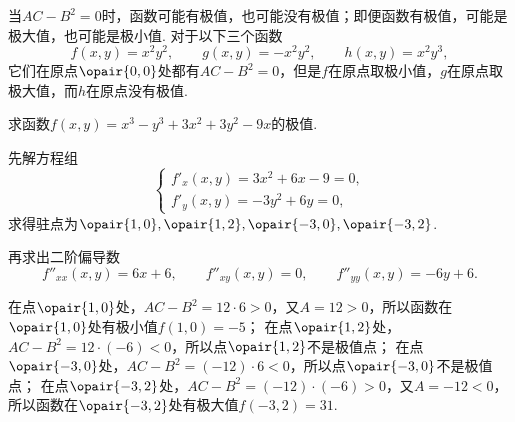 \begin{example}
当\(AC-B^2=0\)时，函数可能有极值，也可能没有极值；即便函数有极值，可能是极大值，也可能是极小值.
对于以下三个函数\[
f(x,y) = x^2 y^2,
\qquad
g(x,y) = -x^2 y^2,
\qquad
h(x,y) = x^2 y^3,
\]它们在原点\(\opair{0,0}\)处都有\(AC-B^2=0\)，但是\(f\)在原点取极小值，\(g\)在原点取极大值，而\(h\)在原点没有极值.
\end{example}

\begin{example}
求函数\(f(x,y) = x^3-y^3+3x^2+3y^2-9x\)的极值.
\begin{solution}
先解方程组\[
\left\{ \begin{array}{l}
f'_x(x,y) = 3x^2+6x-9 = 0, \\
f'_y(x,y) = -3y^2+6y = 0,
\end{array} \right.
\]求得驻点为\(\opair{1,0},\opair{1,2},\opair{-3,0},\opair{-3,2}\).

再求出二阶偏导数\[
f''_{xx}(x,y) = 6x+6,
\qquad
f''_{xy}(x,y) = 0,
\qquad
f''_{yy}(x,y) = -6y+6.
\]

在点\(\opair{1,0}\)处，\(AC-B^2=12\cdot6>0\)，又\(A=12>0\)，所以函数在\(\opair{1,0}\)处有极小值\(f(1,0)=-5\)；
在点\(\opair{1,2}\)处，\(AC-B^2=12\cdot(-6)<0\)，所以点\(\opair{1,2}\)不是极值点；
在点\(\opair{-3,0}\)处，\(AC-B^2=(-12)\cdot6<0\)，所以点\(\opair{-3,0}\)不是极值点；
在点\(\opair{-3,2}\)处，\(AC-B^2=(-12)\cdot(-6)>0\)，又\(A=-12<0\)，所以函数在\(\opair{-3,2}\)处有极大值\(f(-3,2)=31\).
\end{solution}
\end{example}

